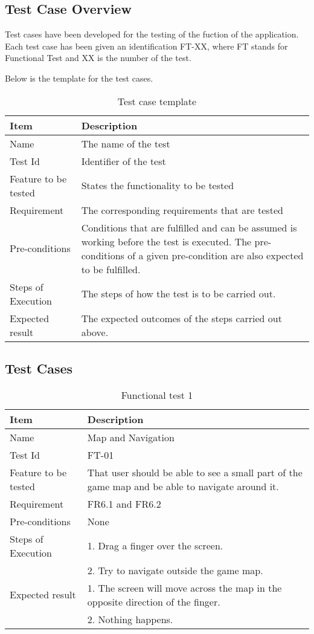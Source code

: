 \subsection{Test Case Overview}

Test cases have been developed for the testing of the fuction of the application. Each test case has been given an identification FT-XX, where FT stands for Functional Test and XX is the number of the test.

Below is the template for the test cases.

\begin{table}[H]
\centering
	\begin{tabular}{ l | p{8cm} }
		\hline
		{\bf Item} & {\bf Description} \\ \hline
		Name & The name of the test \\ 
		Test Id & Identifier of the test \\ 
		Feature to be tested & States the functionality to be tested \\ 
		Requirement & The corresponding requirements that are tested \\ 
		Pre-conditions & Conditions that are fulfilled and can be assumed is working before the test is executed. The pre-conditions of a given pre-condition are also expected to be fulfilled. \\ 
		Steps of Execution & The steps of how the test is to be carried out. \\ 
		Expected result & The expected outcomes of the steps carried out above. \\ 
	\end{tabular}
	\caption{Test case template}
\end{table}

\subsection{Test Cases}

\begin{table}[H]
\centering
	\begin{tabular}{ l | p{8cm} }
		\hline
		{\bf Item} & {\bf Description} \\ \hline
		Name & Map and Navigation \\ 
		Test Id & FT-01 \\ 
		Feature to be tested & That user should be able to see a small part of the game map and be able to navigate around it.\\ 
		Requirement & FR6.1 and FR6.2 \\ 
		Pre-conditions & None \\ 
		Steps of Execution & 1. Drag a finger over the screen. \\
		& 2. Try to navigate outside the game map. \\
		Expected result & 1. The screen will move across the map in the opposite direction of the finger.\\ 
		& 2. Nothing happens. \\
	\end{tabular}
	\caption{Functional test 1}
\end{table}

